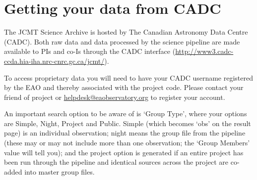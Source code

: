 \section{Getting your data from CADC}

The JCMT Science Archive is hosted by The Canadian Astronomy Data
Centre (CADC). Both raw data and data processed by the science
pipeline are made available to PIs and co-Is through the CADC
interface (\url{http://www3.cadc-ccda.hia-iha.nrc-cnrc.gc.ca/jcmt/}).

To access proprietary data you will need to have your CADC username
registered by the EAO and thereby associated with the project code.
Please contact your friend of project or \url{helpdesk@eaobservatory.org}
to register your account.

An important search option to be aware of is `Group Type', where your
options are Simple, Night, Project and Public. Simple (which becomes
`obs' on the result page) is an individual observation; night means
the group file from the pipeline (these may or may not include more
than one observation; the `Group Members' value will tell you); and
the project option is generated if an entire project has been run
through the pipeline and identical sources across the project are
co-added into master group files.


